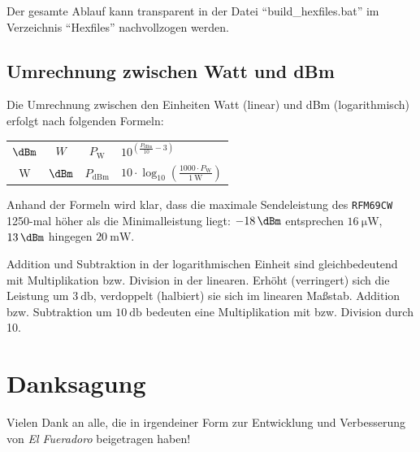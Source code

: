 \documentclass[paper=a4, parskip, numbers=noenddot, toc=listof, headsepline]{scrbook}
\newcommand{\anlage}{\emph{El Fueradoro}}
\begin{document}
			Der gesamte Ablauf kann transparent in der Datei \enquote{build\_hexfiles.bat} im Verzeichnis \enquote{Hexfiles} nachvollzogen werden.

		\section{Umrechnung zwischen Watt und dBm}
			Die Umrechnung zwischen den Einheiten Watt (linear) und dBm (logarithmisch) erfolgt nach folgenden Formeln:

			\begin{center}
				\begin{tabu}
					to .6
					$\si{\dBm}$  & $\si{W}$    & $P_\text{W}$   & $10^{\left(\frac{P_\text{dBm}}{10}-3\right)}$                                      \\[12pt]
					$\si{\watt}$ & $\si{\dBm}$ & $P_\text{dBm}$ & $10 {\cdot} \log_{10}\left( \frac{1000 {\cdot} P_\text{W}}{\SI{1}{\watt}} \right)$ \\
				\end{tabu}
			\end{center}

			Anhand der Formeln wird klar, dass die maximale Sendeleistung des \texttt{RFM69CW} 1250-mal höher als die Minimalleistung liegt: $\SI{-18}{\dBm}$ entsprechen $\SI{16}{\micro\watt}$, $\SI{13}{\dBm}$ hingegen $\SI{20}{\milli\watt}$.

			Addition und Subtraktion in der logarithmischen Einheit sind gleichbedeutend mit Multiplikation bzw. Division in der linearen. Erhöht (verringert) sich die Leistung um $\SI{3}{\decibel}$, verdoppelt (halbiert) sie sich im linearen Maßstab. Addition bzw. Subtraktion um $\SI{10}{\decibel}$ bedeuten eine Multiplikation mit bzw. Division durch 10.

			\listoffigures
			\listoftables

	\chapter*{Danksagung}%

		Vielen Dank an alle, die in irgendeiner Form zur Entwicklung und Verbesserung von {\anlage} beigetragen haben!
\end{document}
